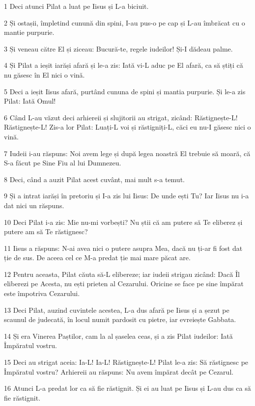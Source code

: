 \par 1 Deci atunci Pilat a luat pe Iisus și L-a biciuit.
\par 2 Și ostașii, împletind cunună din spini, I-au pus-o pe cap și L-au îmbrăcat cu o mantie purpurie.
\par 3 Și veneau către El și ziceau: Bucură-te, regele iudeilor! Și-I dădeau palme.
\par 4 Și Pilat a ieșit iarăși afară și le-a zis: Iată vi-L aduc pe El afară, ca să știți că nu găsesc în El nici o vină.
\par 5 Deci a ieșit Iisus afară, purtând cununa de spini și mantia purpurie. Și le-a zis Pilat: Iată Omul!
\par 6 Când L-au văzut deci arhiereii și slujitorii au strigat, zicând: Răstignește-L! Răstignește-L! Zis-a lor Pilat: Luați-L voi și răstigniți-L, căci eu nu-I găsesc nici o vină.
\par 7 Iudeii i-au răspuns: Noi avem lege și după legea noastră El trebuie să moară, că S-a făcut pe Sine Fiu al lui Dumnezeu.
\par 8 Deci, când a auzit Pilat acest cuvânt, mai mult s-a temut.
\par 9 Și a intrat iarăși în pretoriu și I-a zis lui Iisus: De unde ești Tu? Iar Iisus nu i-a dat nici un răspuns.
\par 10 Deci Pilat i-a zis: Mie nu-mi vorbești? Nu știi că am putere să Te eliberez și putere am să Te răstignesc?
\par 11 Iisus a răspuns: N-ai avea nici o putere asupra Mea, dacă nu ți-ar fi fost dat ție de sus. De aceea cel ce M-a predat ție mai mare păcat are.
\par 12 Pentru aceasta, Pilat căuta să-L elibereze; iar iudeii strigau zicând: Dacă Îl eliberezi pe Acesta, nu ești prieten al Cezarului. Oricine se face pe sine împărat este împotriva Cezarului.
\par 13 Deci Pilat, auzind cuvintele acestea, L-a dus afară pe Iisus și a șezut pe scaunul de judecată, în locul numit pardosit cu pietre, iar evreiește Gabbata.
\par 14 Și era Vinerea Paștilor, cam la al șaselea ceas, și a zis Pilat iudeilor: Iată Împăratul vostru.
\par 15 Deci au strigat aceia: Ia-L! Ia-L! Răstignește-L! Pilat le-a zis: Să răstignesc pe Împăratul vostru? Arhiereii au răspuns: Nu avem împărat decât pe Cezarul.
\par 16 Atunci L-a predat lor ca să fie răstignit. Și ei au luat pe Iisus și L-au dus ca să fie răstignit.

